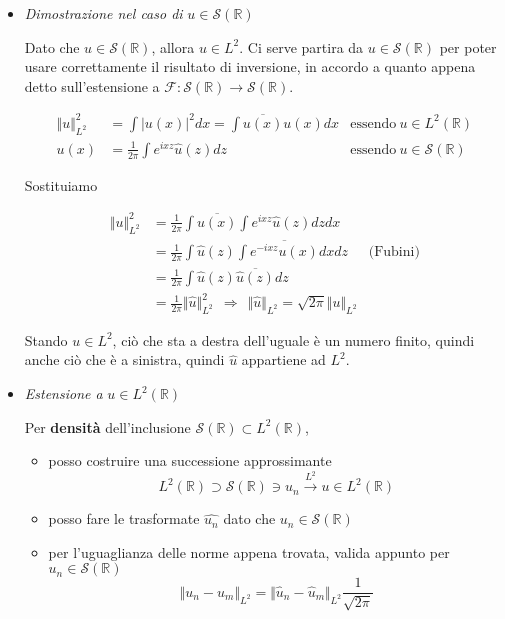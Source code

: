 \begin{itemize}
\item \textit{Dimostrazione nel caso di }$u\in \mathcal{S}(\mathbb{R})$

Dato che $u\in \mathcal{S}(\mathbb{R})$, allora $u\in L^{2}$. Ci serve partira da $u\in \mathcal{S}(\mathbb{R})$ per poter usare correttamente il risultato di inversione, in accordo a quanto appena detto sull'estensione a $\mathcal{F} :\mathcal{S}(\mathbb{R})\rightarrow \mathcal{S}(\mathbb{R})$.

\begin{equation*}
\begin{aligned}
\Vert u\Vert ^{2}_{L^{2}} & =\int | u( x)| ^{2} dx=\int \overline{u( x)} u( x) dx & \text{essendo} \ u\in L^{2}(\mathbb{R})\\
u( x) & =\frac{1}{2\pi }\int e^{ixz}\hat{u}( z) dz & \text{essendo} \ u\in \mathcal{S}(\mathbb{R})
\end{aligned}
\end{equation*}

Sostituiamo

\begin{equation*}
\begin{aligned}
\Vert u\Vert ^{2}_{L^{2}} & =\frac{1}{2\pi }\int \overline{u( x)}\int e^{ixz}\hat{u}( z) dzdx & \\
 & =\frac{1}{2\pi }\int \hat{u}( z)\int \overline{e^{-ixz} u( x)} dxdz & \text{(Fubini)}\\
 & =\frac{1}{2\pi }\int \hat{u}( z)\overline{\hat{u}( z)} dz & \\
 & =\frac{1}{2\pi }\Vert \hat{u}\Vert ^{2}_{L^{2}} \ \ \Rightarrow \ \ \Vert \hat{u}\Vert _{L^{2}} =\sqrt{2\pi }\Vert u\Vert _{L^{2}} & 
\end{aligned}
\end{equation*}

Stando $u\in L^{2}$, ciò che sta a destra dell'uguale è un numero finito, quindi anche ciò che è a sinistra, quindi $\hat{u}$ appartiene ad $L^{2}$.
\item \textit{Estensione a }$u\in L^{2}(\mathbb{R})$

Per \textbf{densità} dell'inclusione $\mathcal{S}(\mathbb{R}) \subset L^{2}(\mathbb{R})$,
\begin{itemize}
\item posso costruire una successione approssimante\begin{equation*}
L^{2}(\mathbb{R}) \supset \mathcal{S}(\mathbb{R}) \ni u_{n}\xrightarrow{L^{2}} u\in L^{2}(\mathbb{R})
\end{equation*}
\item posso fare le trasformate $\widehat{u_{n}}$ dato che $u_{n} \in \mathcal{S}(\mathbb{R})$
\item per l'uguaglianza delle norme appena trovata, valida appunto per $u_{n} \in \mathcal{S}(\mathbb{R})$\begin{equation*}
\Vert u_{n} -u_{m}\Vert _{L^{2}} =\Vert \hat{u}_{n} -\hat{u}_{m}\Vert _{L^{2}}\frac{1}{\sqrt{2\pi }}
\end{equation*}


\end{itemize}
\end{itemize}
